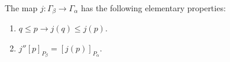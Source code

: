 The map $j: \Gamma_\beta \rightarrow \Gamma_\alpha$ has the following elementary properties:
\begin{enumerate}
\item $q \leq p \rightarrow j(q) \leq j(p)$.
\item $j''[p]_{P_\beta} = [j(p)]_{P_\alpha}$.
\end{enumerate}
